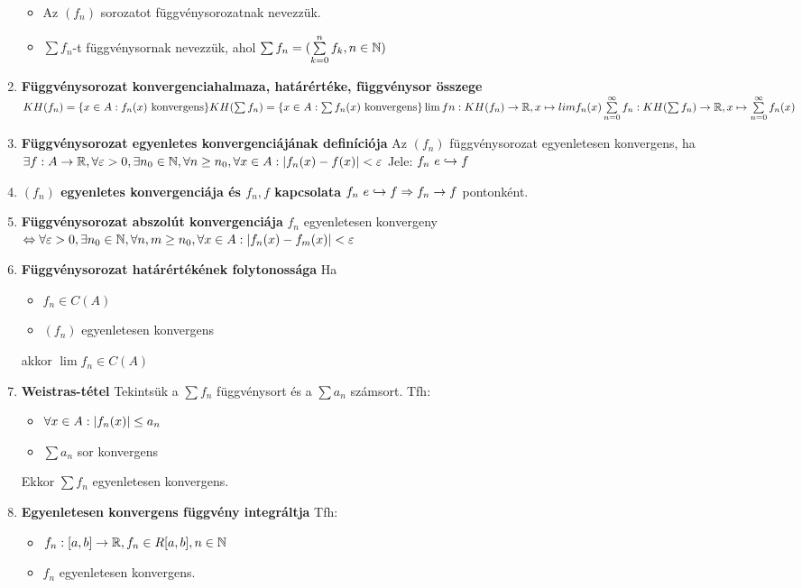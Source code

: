 \documentclass{article}
\begin{document}
\begin{enumerate}
\begin{itemize}
		\item Az $(f_n)$ sorozatot függvénysorozatnak nevezzük.
		\item$\sum f_n$-t függvénysornak nevezzük, ahol $\sum f_n=
		(\sum\limits_{k=0}^n f_k, n\in\mathbb{N})$
	\end{itemize}
	\item\textbf{Függvénysorozat konvergenciahalmaza, határértéke, függvénysor összege}\br
	$KH(f_n)=\{x\in A:f_n(x)\text{ konvergens}\}\br
	KH(\sum f_n)=\{x\in A:\sum f_n(x)\text{ konvergens}\}\br
	\lim fn:KH(f_n)\rightarrow\R,x\mapsto lim f_n(x)\br
	\sum\limits_{n=0}^\infty f_n:KH(\sum f_n)\rightarrow\R,x\mapsto
	\sum\limits_{n=0}^\infty f_n(x)$
	\item\textbf{Függvénysorozat egyenletes konvergenciájának definíciója}\br
	Az $(f_n)$ függvénysorozat egyenletesen konvergens, ha\br$\exists f:A\rightarrow
	\mathbb{R},\forall\varepsilon>0,\exists n_0\in\mathbb{N},\forall n\geq n_0,\forall x\in A:
	\abs{f_n(x) - f(x)}< \varepsilon$\br
	Jele: $f_n \text{ }e\hookrightarrow f$
	\item\textbf{$(f_n)$ egyenletes konvergenciája és $f_n,f$ kapcsolata}\br
	$f_n\text{ }e\hookrightarrow f
	\Rightarrow f_n\rightarrow f$ pontonként.
	\item\textbf{Függvénysorozat abszolút konvergenciája}\br
	$f_n$ egyenletesen konvergeny $\Leftrightarrow\forall\varepsilon>0,
	\exists n_0\in\mathbb{N},\forall n,m\geq n_0,\forall x\in A:\abs{f_n(x) - f_m(x)}< \varepsilon$
	\item\textbf{Függvénysorozat határértékének folytonossága}\br
	Ha \begin{itemize}
		\item $f_n\in C(A)$
		\item $(f_n)$ egyenletesen konvergens
	\end{itemize}
	akkor $\lim f_n\in C(A)$
	\item\textbf{Weistras-tétel}\br
	Tekintsük a $\sum f_n$ függvénysort és a $\sum a_n$ számsort. Tfh:
	\begin{itemize}
		\item $\forall x\in A:\abs{f_n(x)}\leq a_n$
		\item $\sum a_n$ sor konvergens
	\end{itemize}
	Ekkor $\sum f_n$ egyenletesen konvergens.
	\item\textbf{Egyenletesen konvergens függvény integráltja}\br
	Tfh: \begin{itemize}
		\item $f_n:[a,b]\rightarrow\mathbb{R},f_n\in R[a,b],n\in\mathbb{N}$
		\item $f_n$ egyenletesen konvergens.

\end{itemize}
\end{enumerate}
\end{document}
